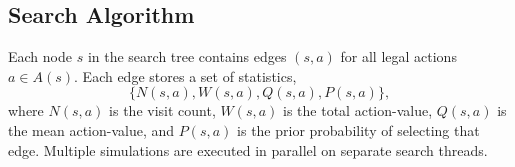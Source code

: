 \documentclass[12pt,a4paper]{article}
\begin{document}
\subsection{Search Algorithm}
\hspace{0.6cm} Each node \(s\) in the search tree contains edges \((s, a)\) for all legal actions \(a \in A(s)\). Each edge stores a set of statistics, \[\{N(s, a), W(s, a), Q(s, a), P(s, a)\},\] where \(N(s, a)\) is the visit count, \(W(s, a)\) is the total action-value, \(Q(s, a)\) is the mean action-value, and \(P(s, a)\) is the prior probability of selecting that edge. Multiple simulations are executed in parallel on separate search threads.
\clearpage


\end{document}
